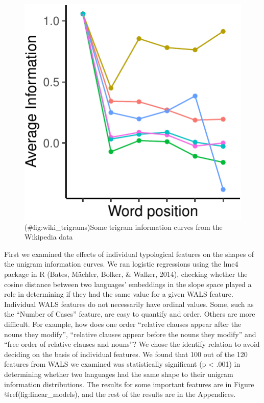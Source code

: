 \documentclass[man,floatsintext]{apa6}
\begin{document}
\begin{figure}
\centering
\includegraphics{figs/wiki_trigrams-1.pdf}
\caption{(\#fig:wiki\_trigrams)Some trigram information curves from the Wikipedia data}
\end{figure}

First we examined the effects of individual typological features on the shapes of the unigram information curves. We ran logistic regressions using the lme4 package in R (Bates, Mächler, Bolker, \& Walker, 2014), checking whether the cosine distance between two languages' embeddings in the slope space played a role in determining if they had the same value for a given WALS feature. Individual WALS features do not necessarily have ordinal values. Some, such as the \enquote{Number of Cases} feature, are easy to quantify and order. Others are more difficult. For example, how does one order \enquote{relative clauses appear after the nouns they modify}, \enquote{relative clauses appear before the nouns they modify} and \enquote{free order of relative clauses and nouns}? We chose the identify relation to avoid deciding on the basis of individual features. We found that 100 out of the 120 features from WALS we examined was statistically significant (p \textless{} .001) in determining whether two languages had the same shape to their unigram information distributions. The results for some important features are in Figure @ref(fig:linear\_models), and the rest of the results are in the Appendices.
\end{document}
